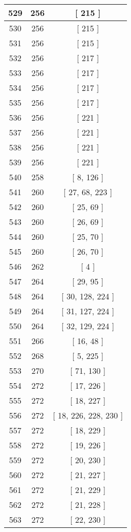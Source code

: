 \begin{center}
\begin{longtable}[H]{|| c c c ||}
\hline
529 & 256 & [ 215 ] \\ 
\hline
530 & 256 & [ 215 ] \\ 
\hline
531 & 256 & [ 215 ] \\ 
\hline
532 & 256 & [ 217 ] \\ 
\hline
533 & 256 & [ 217 ] \\ 
\hline
534 & 256 & [ 217 ] \\ 
\hline
535 & 256 & [ 217 ] \\ 
\hline
536 & 256 & [ 221 ] \\ 
\hline
537 & 256 & [ 221 ] \\ 
\hline
538 & 256 & [ 221 ] \\ 
\hline
539 & 256 & [ 221 ] \\ 
\hline
540 & 258 & [ 8, 126 ] \\ 
\hline
541 & 260 & [ 27, 68, 223 ] \\ 
\hline
542 & 260 & [ 25, 69 ] \\ 
\hline
543 & 260 & [ 26, 69 ] \\ 
\hline
544 & 260 & [ 25, 70 ] \\ 
\hline
545 & 260 & [ 26, 70 ] \\ 
\hline
546 & 262 & [ 4 ] \\ 
\hline
547 & 264 & [ 29, 95 ] \\ 
\hline
548 & 264 & [ 30, 128, 224 ] \\ 
\hline
549 & 264 & [ 31, 127, 224 ] \\ 
\hline
550 & 264 & [ 32, 129, 224 ] \\ 
\hline
551 & 266 & [ 16, 48 ] \\ 
\hline
552 & 268 & [ 5, 225 ] \\ 
\hline
553 & 270 & [ 71, 130 ] \\ 
\hline
554 & 272 & [ 17, 226 ] \\ 
\hline
555 & 272 & [ 18, 227 ] \\ 
\hline
556 & 272 & [ 18, 226, 228, 230 ] \\ 
\hline
557 & 272 & [ 18, 229 ] \\ 
\hline
558 & 272 & [ 19, 226 ] \\ 
\hline
559 & 272 & [ 20, 230 ] \\ 
\hline
560 & 272 & [ 21, 227 ] \\ 
\hline
561 & 272 & [ 21, 229 ] \\ 
\hline
562 & 272 & [ 21, 228 ] \\ 
\hline
563 & 272 & [ 22, 230 ] \\ 
\hline

\end{longtable}
\end{center}
